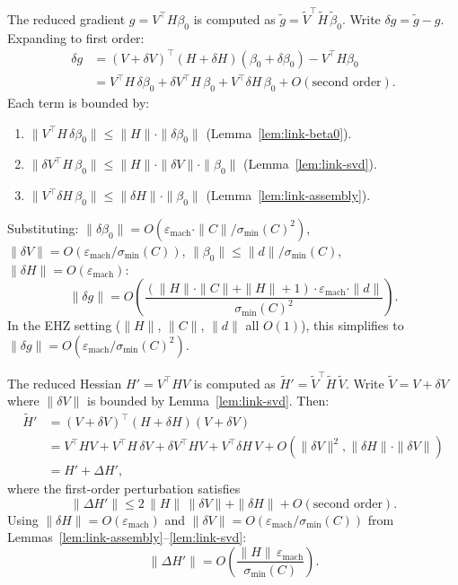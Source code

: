 \begin{lemma}\label{lem:link-gradient}
The reduced gradient $g = V^\top H \beta_0$ is computed as
$\tilde g = \tilde V^\top \tilde H\, \tilde\beta_0$.
Write $\delta g = \tilde g - g$.  Expanding to first order:
\begin{align*}
  \delta g
  &= (V + \delta V)^\top (H + \delta H)(\beta_0 + \delta\beta_0)
     - V^\top H \beta_0 \\
  &= V^\top H\, \delta\beta_0
     + \delta V^\top H\, \beta_0
     + V^\top \delta H\, \beta_0
     + O(\text{second order}).
\end{align*}
Each term is bounded by:
\begin{enumerate}
  \item $\|V^\top H\, \delta\beta_0\|
    \leq \|H\| \cdot \|\delta\beta_0\|$
    \quad (Lemma~\ref{lem:link-beta0}).
  \item $\|\delta V^\top H\, \beta_0\|
    \leq \|H\| \cdot \|\delta V\| \cdot \|\beta_0\|$
    \quad (Lemma~\ref{lem:link-svd}).
  \item $\|V^\top \delta H\, \beta_0\|
    \leq \|\delta H\| \cdot \|\beta_0\|$
    \quad (Lemma~\ref{lem:link-assembly}).
\end{enumerate}
Substituting:
$\|\delta\beta_0\| = O(\varepsilon_{\mathrm{mach}} \cdot \|C\| / \sigma_{\min}(C)^2)$,\;
$\|\delta V\| = O(\varepsilon_{\mathrm{mach}} / \sigma_{\min}(C))$,\;
$\|\beta_0\| \leq \|d\| / \sigma_{\min}(C)$,\;
$\|\delta H\| = O(\varepsilon_{\mathrm{mach}})$:
\begin{equation}\label{eq:gradient-perturbation}
  \|\delta g\|
  = O\!\left(
    \frac{(\|H\| \cdot \|C\| + \|H\| + 1) \cdot
          \varepsilon_{\mathrm{mach}} \cdot \|d\|}
         {\sigma_{\min}(C)^2}
  \right).
\end{equation}
In the EHZ setting ($\|H\|$, $\|C\|$, $\|d\|$ all $O(1)$),
this simplifies to $\|\delta g\| = O(\varepsilon_{\mathrm{mach}} / \sigma_{\min}(C)^2)$.
\end{lemma}


\begin{lemma}\label{lem:link-reduced-hessian}
The reduced Hessian $H' = V^\top H V$ is computed as
$\tilde H' = \tilde V^\top \tilde H\, \tilde V$.
Write $\tilde V = V + \delta V$ where $\|\delta V\|$ is bounded
by Lemma~\ref{lem:link-svd}. Then:
\begin{align*}
  \tilde H'
  &= (V + \delta V)^\top (H + \delta H) (V + \delta V) \\
  &= V^\top H V
     + V^\top H\, \delta V
     + \delta V^\top H V
     + V^\top \delta H\, V
     + O(\|\delta V\|^2, \|\delta H\| \cdot \|\delta V\|) \\
  &= H' + \Delta H',
\end{align*}
where the first-order perturbation satisfies
\[
  \|\Delta H'\|
  \leq 2\,\|H\|\,\|\delta V\| + \|\delta H\| + O(\text{second order}).
\]
Using $\|\delta H\| = O(\varepsilon_{\mathrm{mach}})$
and $\|\delta V\| = O(\varepsilon_{\mathrm{mach}} / \sigma_{\min}(C))$
from Lemmas~\ref{lem:link-assembly}--\ref{lem:link-svd}:
\[
  \|\Delta H'\|
  = O\!\left(
    \frac{\|H\|\, \varepsilon_{\mathrm{mach}}}{\sigma_{\min}(C)}
  \right).
\]
\end{lemma}


